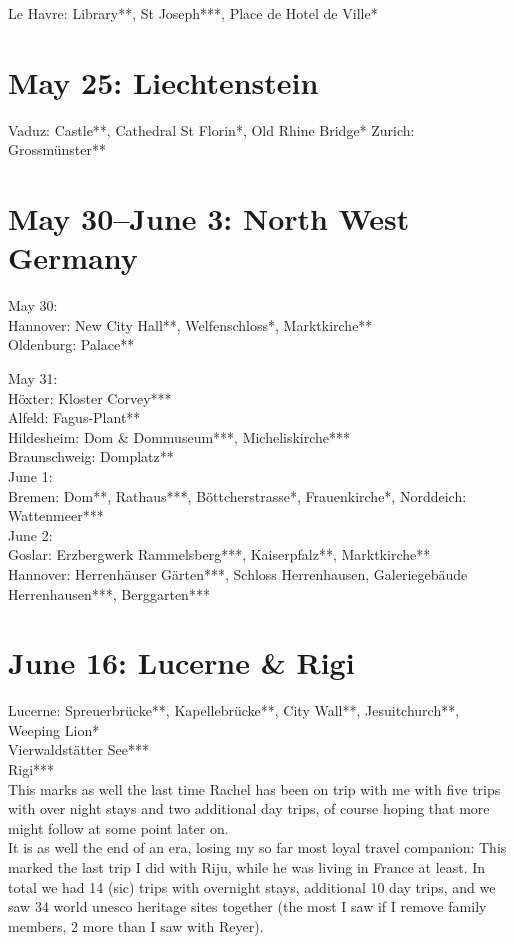 Le Havre: Library**, St Joseph***, Place de Hotel de Ville*

\section{May 25: Liechtenstein}
\label{2019Liechtenstein}

Vaduz: Castle**, Cathedral St Florin*, Old Rhine Bridge*
Zurich: Grossm\"unster**

\section{May 30--June 3: North West Germany}
\label{2019:Northwestgermany}

May 30:\\
Hannover: New City Hall**, Welfenschloss*, Marktkirche**\\
Oldenburg: Palace**

May 31:\\
H\"oxter: Kloster Corvey***\\
Alfeld: Fagus-Plant**\\
Hildesheim: Dom \& Dommuseum***, Micheliskirche***\\
Braunschweig: Domplatz**\\

June 1:\\
Bremen: Dom**, Rathaus***, B\"ottcherstrasse*, Frauenkirche*, Norddeich: Wattenmeer***\\

June 2:\\
Goslar: Erzbergwerk Rammelsberg***, Kaiserpfalz**, Marktkirche**\\
Hannover: Herrenh\"auser G\"arten***, Schloss Herrenhausen, Galeriegeb\"aude Herrenhausen***, Berggarten***

\section{June 16: Lucerne \& Rigi}
\label{LucerneRigi2019}

Lucerne: Spreuerbr\"ucke**, Kapellebr\"ucke**, City Wall**, Jesuitchurch**, Weeping Lion*\\
Vierwaldst\"atter See***\\
Rigi***\\

This marks as well the last time Rachel has been on trip with me with five trips with over night stays and two additional day trips, of course hoping that more might follow at some point later on.\\
It is as well the end of an era, losing my so far most loyal travel companion: This marked the last trip I did with Riju, while he was living in France at least. In total we had 14 (sic) trips with overnight stays, additional 10 day trips, and we saw 34 world unesco heritage sites together (the most I saw if I remove family members, 2 more than I saw with Reyer). 


